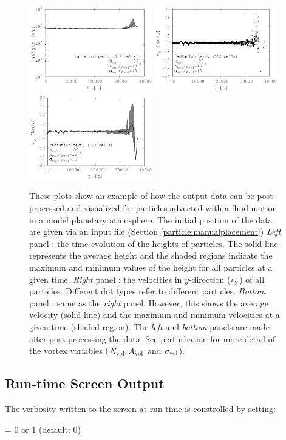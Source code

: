 \begin{figure}[h]
	\centering
	\includegraphics[width=2.1in]{tracerparticleaverage}
	\includegraphics[width=2.1in]{tracerparticleeachvy}
	\includegraphics[width=2.1in]{tracerparticlevyaverage}
	\caption{These plots show an example of how the output data can be post-processed and visualized for particles advected with a fluid motion in a model planetary atmosphere. The initial position of the data are given via an input file (Section \ref{particle:manualplacement}) 
		\textit{Left} panel : the time evolution of the heights of particles. The solid line represents the average height and the shaded regions indicate the maximum and minimum values of the height for all particles at a given time. \textit{Right} panel : the velocities in $y$-direction ($v_{\rm y}$) of all particles. Different dot types refer to different particles. \textit{Bottom} panel : same as the \textit{right} panel. However, this shows the average velocity (solid line) and the maximum and minimum velocities at a given time (shaded region). The \textit{left} and \textit{bottom} panels are made after post-processing the data. See perturbation for more detail of the vortex variables ($N_{\rm vol}, A_{\rm vol}$ and $\sigma_{\rm vol}$).}
\end{figure}


\subsection{Run-time Screen Output}

The verbosity written to the screen at run-time is constrolled by setting:

 = 0 or 1 (default: 0)\\


%